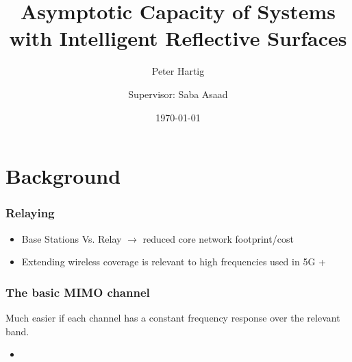 \documentclass[10pt,tgadventor, onlymath]{beamer}
\title{\large \bfseries Asymptotic Capacity of Systems with Intelligent Reflective Surfaces}
\author{Peter Hartig \\ \and Supervisor: Saba Asaad}
\date{\today}
\begin{document}
\frame{
\thispagestyle{empty}
\titlepage
}

\section{Background}

\begin{frame}
\frametitle{Relaying}

	\begin{itemize}
		\item 			
			Base Stations Vs. Relay $\rightarrow$ reduced core network footprint/cost
		\item 
			Extending wireless coverage is relevant to high frequencies used in 5G +
	\end{itemize}

\end{frame}

\begin{frame}
\frametitle{The basic MIMO channel}
Much easier if each channel has a constant frequency response over the relevant band.
	\begin{itemize}
		\item 			
			
	\end{itemize}

\end{frame}
\end{document}
